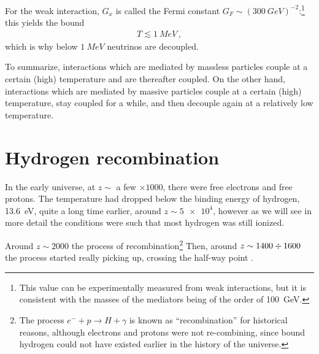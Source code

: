 \documentclass[main.tex]{subfiles}
\begin{document}

For the weak interaction, \(G_x\) is called the Fermi constant \(G_F \sim (\SI{300}{GeV})^{-2}\):\footnote{This value can be  experimentally measured from weak interactions, but it is consistent with the masses of the mediators being of the order of \SI{100}{GeV}.} this yields the bound
%
\begin{align}
T \lesssim \SI{1}{MeV}
\,,
\end{align}
%
which is why below \(\SI{1}{MeV}\) neutrinos are decoupled.


To summarize, interactions which are mediated by massless particles couple at a certain (high) temperature and are thereafter coupled.
On the other hand, interactions which are mediated by massive particles couple at a certain (high) temperature, stay coupled for a while, and then decouple again at a relatively low temperature. 

\section{Hydrogen recombination}

In the early universe, at \(z \sim\) a few \(\times 1000\), there were free electrons and free protons.
The temperature had dropped below the binding energy of hydrogen, \SI{13.6}{eV}, quite a long time earlier, around \(z \sim \num{5e4}\), however as we will see in more detail the conditions were such that most hydrogen was still ionized. 

Around \(z \sim 2000\) the process of recombination\footnote{The process \(e^{-} + p \to H + \gamma \) is known as ``recombination'' for historical reasons, although electrons and protons were not re-combining, since bound hydrogen could not have existed earlier in the history of the universe.}
Then, around \(z \sim 1400 \divisionsymbol 1600\) \cite[table 9.1]{LucchinColes:2002} the process started really picking up, crossing the half-way point . 
\end{document}
